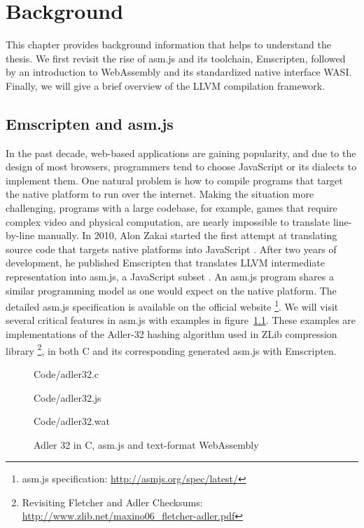 \chapter{Background}
This chapter provides background information that helps to understand the thesis. We first revisit the rise of asm.js and its toolchain, Emscripten, followed by an introduction to WebAssembly and its standardized native interface WASI. Finally, we will give a brief overview of the LLVM compilation framework.

\section{Emscripten and asm.js}

In the past decade, web-based applications are gaining popularity, and due to the design of most browsers, programmers tend to choose JavaScript or its dialects to implement them. One natural problem is how to compile programs that target the native platform to run over the internet. Making the situation more challenging, programs with a large codebase, for example, games that require complex video and physical computation, are nearly impossible to translate line-by-line manually. In 2010, Alon Zakai started the first attempt at translating source code that targets native platforms into JavaScript \cite{8118483}. After two years of development, he published Emscripten that translates LLVM intermediate representation into asm.js, a JavaScript subset \cite{10.1145/2048147.2048224}. An asm.js program shares a similar programming model as one would expect on the native platform. The detailed asm.js specification is available on the official website \footnote{asm.js specification: \url{http://asmjs.org/spec/latest/}}. We will visit several critical features in asm.js with examples in figure~\ref{fig:alder-32}. These examples are implementations of the Adler-32 hashing algorithm used in ZLib compression library \cite{adler32-paper} \footnote{Revisiting Fletcher and Adler Checksums: \\\url{http://www.zlib.net/maxino06\_fletcher-adler.pdf}}, in both C and its corresponding generated asm.js with Emscripten.

\begin{figure}
  \centering
  
  {Code/adler32.c}
  
  {Code/adler32.js}
  
  {Code/adler32.wat}
  \caption{Adler 32 in C, asm.js and text-format WebAssembly}
  \label{fig:alder-32}
\end{figure}

